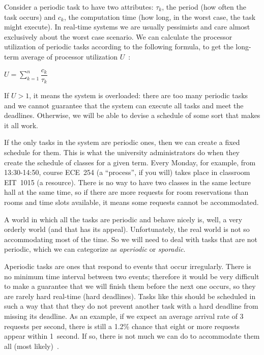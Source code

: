 Consider a periodic task to have two attributes: $\tau_{k}$, the period (how often the task occurs) and $c_{k}$, the computation time (how long, in the worst case, the task might execute). In real-time systems we are usually pessimists and care almost exclusively about the worst case scenario. We can calculate the processor utilization of periodic tasks according to the following formula, to get the long-term average of processor utilization $U$~\cite{mte241}:

\begin{center}
$U = \sum\limits_{k=1}^n\dfrac{c_{k}}{\tau_{k}}$
\end{center}

If $U > 1$, it means the system is overloaded: there are too many periodic tasks and we cannot guarantee that the system can execute all tasks and meet the deadlines. Otherwise, we will be able to devise a schedule of some sort that makes it all work.

If the only tasks in the system are periodic ones, then we can create a fixed schedule for them. This is what the university administrators do when they create the schedule of classes for a given term. Every Monday, for example, from 13:30-14:50, course ECE~254 (a ``process'', if you will) takes place in classroom EIT~1015 (a resource). There is no way to have two classes in the same lecture hall at the same time, so if there are more requests for room reservations than rooms and time slots available, it means some requests cannot be accommodated.

A world in which all the tasks are periodic and behave nicely is, well, a very orderly world (and that has its appeal). Unfortunately, the real world is not so accommodating most of the time. So we will need to deal with tasks that are not periodic, which we can categorize as \textit{aperiodic} or \textit{sporadic}.

Aperiodic tasks are ones that respond to events that occur irregularly. There is no minimum time interval between two events; therefore it would be very difficult to make a guarantee that we will finish them before the next one occurs, so they are rarely hard real-time (hard deadlines). Tasks like this should be scheduled in such a way that that they do not prevent another task with a hard deadline from missing its deadline. As an example, if we expect an average arrival rate of 3 requests per second, there is still a 1.2\% chance that eight or more requests appear within 1~second. If so, there is not much we can do to accommodate them all (most likely)~\cite{mte241}.

